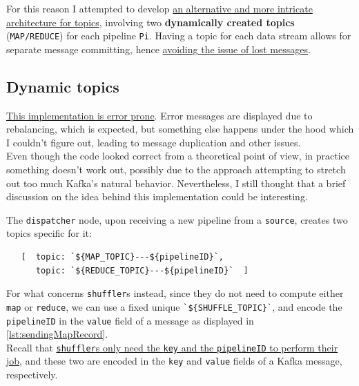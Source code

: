 
For this reason I attempted to develop \ul{an alternative and more intricate architecture for topics}, involving two \textbf{dynamically created topics} (\verb|MAP/REDUCE|) for each pipeline \verb|Pi|.
Having a topic for each data stream allows for separate message committing, hence \ul{avoiding the issue of lost messages}.

\subsection{Dynamic topics}

\ul{This implementation is error prone}. Error messages are displayed due to rebalancing, which is expected, but something else happens under the hood which I couldn't figure out, leading to message duplication and other issues.\\
Even though the code looked correct from a theoretical point of view, in practice something doesn't work out, possibly due to the approach attempting to stretch out too much Kafka's natural behavior. Nevertheless, I still thought that a brief discussion on the idea behind this implementation could be interesting.  

The \texttt{dispatcher} node, upon receiving a new pipeline from a \texttt{source}, creates two topics specific for it:
\begin{lstlisting}
   [  topic: `${MAP_TOPIC}---${pipelineID}`,
      topic: `${REDUCE_TOPIC}---${pipelineID}`  ]
\end{lstlisting}

For what concerns \texttt{shuffler}s instead, since they do not need to compute either \verb|map| or \verb|reduce|, we can use a fixed unique \verb|`${SHUFFLE_TOPIC}`|, and encode the \verb|pipelineID| in the \verb|value| field of a message as displayed in \ref{lst:sendingMapRecord}.\\
Recall that \ul{\texttt{shuffler}s only need the \texttt{key} and the \texttt{pipelineID} to perform their job}, and these two are encoded in the \verb|key| and \verb|value| fields of a Kafka message, respectively. 

